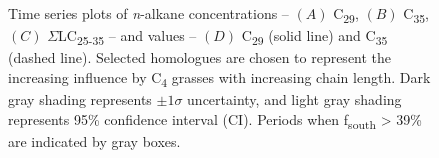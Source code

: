\begin{figure}[p]
	\caption[\textit{n}-alkane concentration and  time-series plots]{Time series plots of \textit{n}-alkane concentrations -- $(A)$ C\textsubscript{29}, $(B)$ C\textsubscript{35}, $(C)$ $\Sigma$LC\textsubscript{25-35} -- and  values -- $(D)$ C\textsubscript{29} (solid line) and C\textsubscript{35} (dashed line). Selected homologues are chosen to represent the increasing influence by C\textsubscript{4} grasses with increasing chain length. Dark gray shading represents $\pm 1\sigma$ uncertainty, and light gray shading represents 95\% confidence interval (CI). Periods when f\textsubscript{south} > 39\% are indicated by gray boxes.}
	\label{Ch4Fig:4} 
\end{figure}

